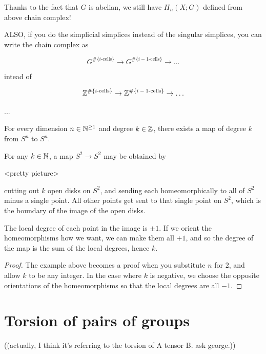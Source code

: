 \documentclass[11pt,leqno,oneside]{amsart}
\newenvironment{dateenv}{
  \vspace{1em}
}{
  \vspace{1em}
}
\newcommand{\mydate}[4]{
  \newdate{#1}{#2}{#3}{#4}
  \begin{dateenv}
    \hfill\displaydate{#1}
  \end{dateenv}
}
\numberwithin{thm}{section}
\begin{document}
  Thanks to the fact that $G$ is abelian, we still have $H_n(X; G)$ defined from above chain complex!

  ALSO, if you do the simplicial simplices instead of the singular simplices, you can write the chain complex as

  $$G^{\#\{\text{$i$-cells}\}} \to G^{\#\{\text{$i-1$-cells}\}} \to \ldots$$

  intead of

  $${\mathbb Z}^{\#\{\text{$i$-cells}\}} \to {\mathbb Z}^{\#\{\text{$i-1$-cells}\}} \to \ldots$$

  ...

\begin{thm}
  For every dimension $n \in {\mathbb N}^{\geq 1}$ and degree $k \in {\mathbb Z}$, there exists a map of degree $k$ from $S^n$ to $S^n$.
\end{thm}
\begin{example}
  For any $k \in {\mathbb N}$, a map $S^2 \to S^2$ may be obtained by

  <pretty picture>

  cutting out $k$ open disks on $S^2$, and sending each homeomorphically to all of $S^2$ minus a single point.  All other points get sent to that single point on $S^2$, which is the boundary of the image of the open disks.

  The local degree of each point in the image is $\pm 1$.  If we orient the homeomorphisms how we want, we can make them all $+1$, and so the degree of the map is the sum of the local degrees, hence $k$.
\end{example}
\begin{proof}
  The example above becomes a proof when you substitute $n$ for 2, and allow $k$ to be any integer.  In the case where $k$ is negative, we choose the opposite orientations of the homeomorphisms so that the local degrees are all $-1$.
\end{proof}


\mydate{dk}{17}{4}{2017}

\section*{Torsion of pairs of groups}
((actually, I think it's referring to the torsion of A tensor B.  ask george.))
\end{document}
